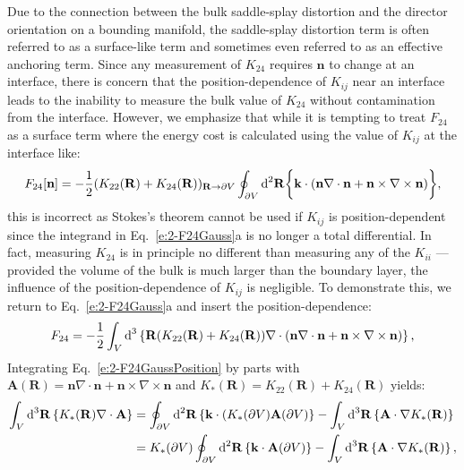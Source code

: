 Due to the connection between the bulk saddle-splay distortion and the director orientation on a bounding manifold, the saddle-splay distortion term is often referred to as a surface-like term and sometimes even referred to as an effective anchoring term.
Since any measurement of $K_{24}$ requires $\mathbf{n}$ to change at an interface, there is concern that the position-dependence of $K_{ij}$ near an interface leads to the inability to measure the bulk value of $K_{24}$ without contamination from the interface.
However, we emphasize that while it is tempting to treat $F_{24}$ as a surface term where the energy cost is calculated using the value of $K_{ij}$ at the interface like:
\begin{equation}
  F_{24}[\mathbf{n}] = - \frac{1}{2}(K_{22}(\mathbf{R}) + K_{24}(\mathbf{R}))_{\mathbf{R} \rightarrow \partial V} \oint_{\partial V} \textup{d}^2  \mathbf{R} \bigg \{   \mathbf{k} \cdot (\mathbf{n}\nabla \cdot \mathbf{n} + \mathbf{n} \times \nabla \times \mathbf{n}) \bigg \},
\end{equation}
this is incorrect as Stokes's theorem cannot be used if $K_{ij}$ is position-dependent since the integrand in Eq.~\ref{e:2-F24Gauss}a is no longer a total differential.
In fact, measuring $K_{24}$ is in principle no different than measuring any of the $K_{ii}$ --- provided the volume of the bulk is much larger than the boundary layer, the influence of the position-dependence of $K_{ij}$ is negligible.
To demonstrate this, we return to Eq.~\ref{e:2-F24Gauss}a and insert the position-dependence:
\begin{equation}
  F_{24} = -\frac{1}{2}\int_{V}\textup{d}^3 \left \{\mathbf{R} (K_{22} (\mathbf{R}) + K_{24}(\mathbf{R})) \nabla \cdot (\mathbf{n} \nabla \cdot \mathbf{n} + \mathbf{n} \times \nabla \times \mathbf{n}) \right \},\label{e:2-F24GaussPosition}
\end{equation}
Integrating Eq.~\ref{e:2-F24GaussPosition} by parts with $\mathbf{A}(\mathbf{R}) = \mathbf{n} \nabla \cdot \mathbf{n} + \mathbf{n} \times \nabla \times \mathbf{n}$ and $K_*(\mathbf{R}) = K_{22} (\mathbf{R}) + K_{24}(\mathbf{R})$ yields:
\begin{align}
  \int_{V}\textup{d}^3\mathbf{R} \left \{ K_{*} (\mathbf{R}) \nabla \cdot \mathbf{A} \right \} &=
  \oint_{\partial V}\textup{d}^2 \mathbf{R} \left \{ \mathbf{k} \cdot (K_{*} (\partial V) \mathbf{A}(\partial V) \right \} -  \int_{V} \textup{d}^3\mathbf{R} \left \{ \mathbf{A} \cdot \nabla K_{*} (\mathbf{R}) \right \}  \\ &=
  K_*(\partial V) \oint_{\partial V} \textup{d}^2\mathbf{R} \left \{ \mathbf{k} \cdot \mathbf{A}(\partial V)\right \} - \int_{V} \textup{d}^3\mathbf{R} \left \{ \mathbf{A} \cdot \nabla K_{*} (\mathbf{R}) \right \}, \label{e:2-pos_stokes1}
\end{align}
